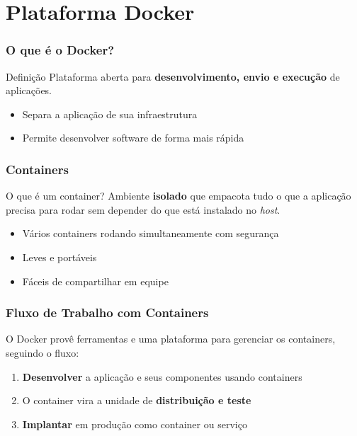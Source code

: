\section{Plataforma Docker}

\begin{frame}
  \frametitle{O que é o Docker?}
  \begin{block}{Definição}
    Plataforma aberta para \textbf{desenvolvimento, envio e execução} de aplicações.
  \end{block}

  \vspace{0.5em}
  \begin{itemize}
    \item Separa a aplicação de sua infraestrutura
    \item Permite desenvolver software de forma mais rápida
  \end{itemize}
\end{frame}


\begin{frame}
  \frametitle{Containers}
  \begin{block}{O que é um container?}
    Ambiente \textbf{isolado} que empacota tudo o que a aplicação precisa para rodar sem depender do que está instalado no \textit{host}.
  \end{block}

  \vspace{0.5em}
  \begin{itemize}
    \item Vários containers rodando simultaneamente com segurança
    \item Leves e portáveis
    \item Fáceis de compartilhar em equipe
  \end{itemize}
\end{frame}

\begin{frame}
  \frametitle{Fluxo de Trabalho com Containers}
  O Docker provê ferramentas e uma plataforma para gerenciar os containers, seguindo o fluxo:

  \vspace{0.5em}
  \begin{enumerate}
    \item<2-> \textbf{Desenvolver} a aplicação e seus componentes usando containers
    \item<3-> O container vira a unidade de \textbf{distribuição e teste}
    \item<4-> \textbf{Implantar} em produção como container ou serviço
  \end{enumerate}
\end{frame}

